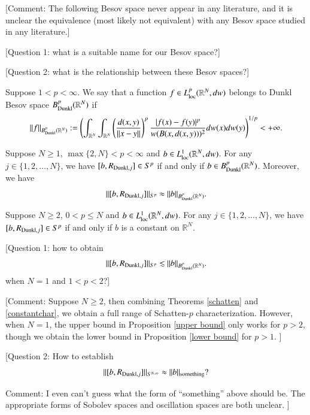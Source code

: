 \documentclass[12pt]{amsart}
\begin{document}
{\color{red}[Comment: The following Besov space never appear in any literature, and it is unclear the equivalence (most likely not equivalent) with any Besov space studied in any literature.]

[Question 1: what is a suitable name for our Besov space?]

[Question 2: what is the relationship between these Besov spaces?]}
\begin{definition}{\rm\label{beso}
Suppose $1< p< \infty$. We say that a  function $f\in L^p_{{\rm loc}}(\mathbb{R}^{N},dw)$ belongs to {\color{red}Dunkl} Besov space $B^{p}_{{\rm Dunkl}}(\mathbb{R}^N)$ if
\begin{align*}
\|f\|_{B^{p}_{{\rm Dunkl}}(\mathbb{R}^N)}:=\left(\int_{\mathbb{R}^{N}}\int_{\mathbb{R}^{N}}\left(\frac{d(x,y)}{\|x-y\|}\right)^{p}\frac{|f(x)-f(y)|^p}{w(B(x,d(x,y)))^2}dw(x)dw(y)\right)^{1/p}<+\infty.
\end{align*}}
\end{definition}

\begin{theorem}\label{schatten}
Suppose $N\geq 1$, {\color{red}$\max\{2,N\}<p<\infty$} and $b\in  L^1_{{\rm loc}}(\mathbb R^{N},dw)$. For any $j\in\{1,2,...,N\}$, we have  $[b,R_{{\rm Dunkl},j}]\in S^p$
if and only if $b\in B^{p}_{{\rm Dunkl}}(\mathbb{R}^N)$.  Moreover, we have $$ \|[b,R_{{\rm Dunkl},j}]\|_{S^p}\approx \|b\|_{B^{p}_{{\rm Dunkl}}(\mathbb{R}^N)}.$$
\end{theorem}

\begin{theorem}\label{constantchar}
Suppose $N\geq 2$, $0< p\leq N$ and $b\in  L^1_{{\rm loc}}(\mathbb R^{N},dw)$. For any $j\in\{1,2,...,N\}$, we have  $[b,R_{{\rm Dunkl},j}]\in S^p$
if and only if $b$ is a constant on $\mathbb{R}^N$.
\end{theorem}


{\color{red}[Question 1: how to obtain $$ \|[b,R_{{\rm Dunkl},j}]\|_{S^p}\lesssim \|b\|_{B^{p}_{{\rm Dunkl}}(\mathbb{R}^N)}.$$ when $N=1$ and $1<p<2$?]}

{\color{red}[Comment: Suppose $N\geq 2$, then combining Theorems \ref{schatten} and \ref{constantchar}, we obtain a full range of Schatten-$p$ characterization. However, when $N=1$, the upper bound in Proposition \ref{upper bound} only works for $p>2$, though we obtain the lower bound in Proposition \ref{lower bound} for $p>1$. ]}

{\color{red}[Question 2: How to establish
$$ \|[b,R_{{\rm Dunkl},j}]\|_{S^{N,\infty}}\approx \|b\|_{{\rm something}}?$$

Comment: I even can't guess what the form of ``something'' above should be. The appropriate forms of Sobolev spaces and  oscillation spaces are both unclear.
]}
\end{document}
